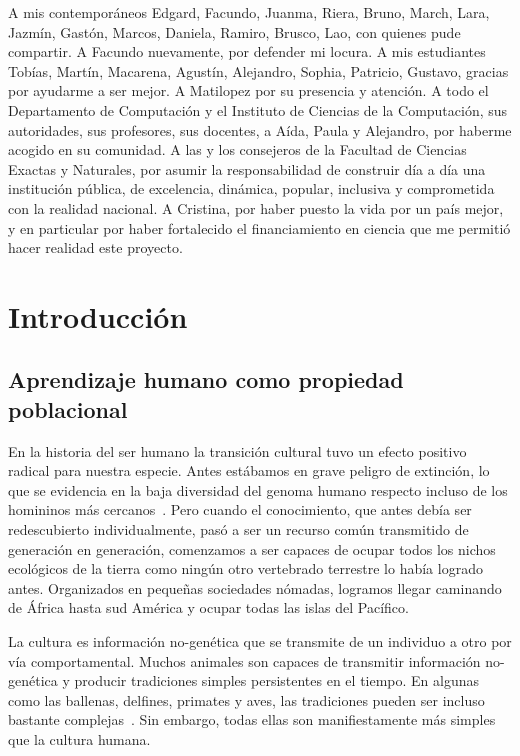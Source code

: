 \documentclass[a4paper,11pt]{book}
\makeatletter
\renewcommand{\mainmatter}{\cleardoublepage\@mainmattertrue}
\theoremstyle{definition}
\makeatother
\begin{document}
%
A mis contemporáneos Edgard, Facundo, Juanma, Riera, Bruno, March, Lara, Jazmín, Gastón, Marcos, Daniela, Ramiro, Brusco, Lao, con quienes pude compartir.
%
A Facundo nuevamente, por defender mi locura.
%
A mis estudiantes Tobías, Martín, Macarena, Agustín, Alejandro, Sophia, Patricio, Gustavo, gracias por ayudarme a ser mejor.
%
A Matilopez por su presencia y atención.
%
A todo el Departamento de Computación y el Instituto de Ciencias de la Computación, sus autoridades, sus profesores, sus docentes, a Aída, Paula y Alejandro, por haberme acogido en su comunidad.
%
A las y los consejeros de la Facultad de Ciencias Exactas y Naturales, por asumir la responsabilidad de construir día a día una institución pública, de excelencia, dinámica, popular, inclusiva y comprometida con la realidad nacional.
%
A Cristina, por haber puesto la vida por un país mejor, y en particular por haber fortalecido el financiamiento en ciencia que me permitió hacer realidad este proyecto.








\mainmatter

\chapter{Introducción} \label{ch:evo}


\section{Aprendizaje humano como propiedad poblacional}

En la historia del ser humano la transición cultural tuvo un efecto positivo radical para nuestra especie.
%
Antes estábamos en grave peligro de extinción, lo que se evidencia en la baja diversidad del genoma humano respecto incluso de los homininos más cercanos~\cite{hrdy2009-mothers}.
%
Pero cuando el conocimiento, que antes debía ser redescubierto individualmente, pasó a ser un recurso común transmitido de generación en generación, comenzamos a ser capaces de ocupar todos los nichos ecológicos de la tierra como ningún otro vertebrado terrestre lo había logrado antes.
%
Organizados en pequeñas sociedades nómadas, logramos llegar caminando de África hasta sud América y ocupar todas las islas del Pacífico.


La cultura es información no-genética que se transmite de un individuo a otro por vía comportamental.
%
Muchos animales son capaces de transmitir información no-genética y producir tradiciones simples persistentes en el tiempo.
%
En algunas como las ballenas, delfines, primates y aves, las tradiciones pueden ser incluso bastante complejas~\cite{aplin2022-birdsCulture}.
%
Sin embargo, todas ellas son manifiestamente más simples que la cultura humana.
\end{document}
